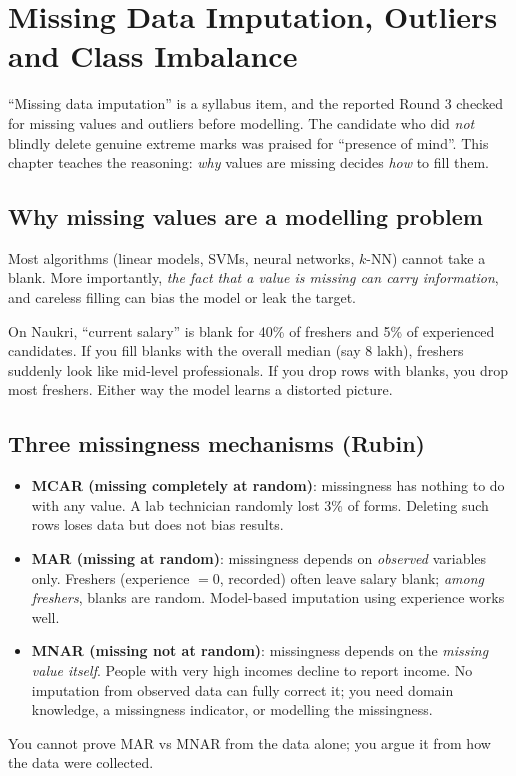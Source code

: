 \chapter{Missing Data Imputation, Outliers and Class Imbalance}

``Missing data imputation'' is a syllabus item, and the reported Round 3 checked for missing values and outliers before
modelling. The candidate who did \emph{not} blindly delete genuine extreme marks was praised for ``presence of mind''.
This chapter teaches the reasoning: \emph{why} values are missing decides \emph{how} to fill them.

\section{Why missing values are a modelling problem}
Most algorithms (linear models, SVMs, neural networks, $k$-NN) cannot take a blank. More importantly, \emph{the fact that a
value is missing can carry information}, and careless filling can bias the model or leak the target.

\begin{example}
On Naukri, ``current salary'' is blank for 40\% of freshers and 5\% of experienced candidates. If you fill blanks with the
overall median (say 8 lakh), freshers suddenly look like mid-level professionals. If you drop rows with blanks, you drop most
freshers. Either way the model learns a distorted picture.
\end{example}

\section{Three missingness mechanisms (Rubin)}
\begin{itemize}
\item \textbf{MCAR (missing completely at random)}: missingness has nothing to do with any value. A lab technician randomly lost 3\%
  of forms. Deleting such rows loses data but does not bias results.
\item \textbf{MAR (missing at random)}: missingness depends on \emph{observed} variables only. Freshers (experience $=0$, recorded)
  often leave salary blank; \emph{among freshers}, blanks are random. Model-based imputation using experience works well.
\item \textbf{MNAR (missing not at random)}: missingness depends on the \emph{missing value itself}. People with very high incomes
  decline to report income. No imputation from observed data can fully correct it; you need domain knowledge, a missingness
  indicator, or modelling the missingness.
\end{itemize}
You cannot prove MAR vs MNAR from the data alone; you argue it from how the data were collected.

